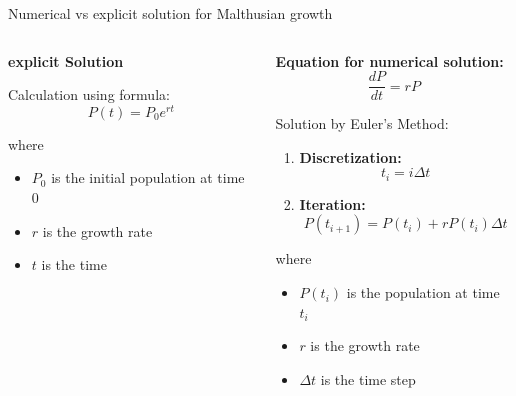 \begin{frame}{Numerical vs explicit solution for Malthusian growth}
\footnotesize

\begin{columns}
    \begin{column}{0.45\textwidth}
       \textbf{explicit Solution}
       
       Calculation using formula:
       \begin{equation*}
    P(t) = P_0 e^{rt} 
  \end{equation*}

  where 
\begin{itemize}
    \item $P_0$ is the initial population at time $0$
    \item $r$ is the growth rate
    \item $t$ is the time
\end{itemize}

        
    \end{column}
    
  \hspace{1em}
\vrule{}
  \hspace{1em}

    \begin{column}{0.45\textwidth}
   \textbf{Equation for numerical solution:}  
   \begin{equation*}
   \frac{dP}{dt} = rP 
\end{equation*}

\vspace{1em}
  Solution by Euler's Method:
 \begin{enumerate}
     \item  \textbf{Discretization:}
     \begin{equation*}
         t_i = i \Delta t
     \end{equation*}
        \item  \textbf{Iteration:}
     \begin{equation*}
         P(t_{i+1}) = P(t_i) + rP(t_i) \Delta t
     \end{equation*}
 \end{enumerate}
where 
\begin{itemize}
    \item $P(t_i)$ is the population at time $t_i$
    \item $r$ is the growth rate
    \item $\Delta t$ is the time step
\end{itemize}
    \end{column}
\end{columns}
\end{frame}




